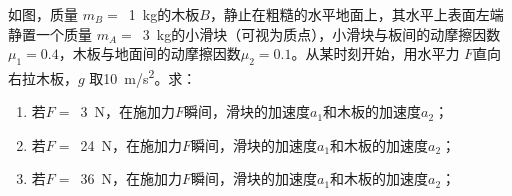 如图，质量 \(m_B=\) \,\qty{1}{kg}的木板\(B\)，静止在粗糙的水平地面上，其水平上表面左端静置一个质量 \(m_A =\) \,\qty{3}{kg}的小滑块（可视为质点），小滑块与板间的动摩擦因数 \(\mu_1 = 0.4\)，木板与地面间的动摩擦因数\(\mu_2 = 0.1\)。从某时刻开始，用水平力 \(F\)直向右拉木板，\(g\) 取\qty{10}{m/s^2}。求：
\begin{enumerate}
	\item 若\(F =\) \,\qty{3}{N}，在施加力\(F\)瞬间，滑块的加速度\(a_1\)和木板的加速度\(a_2\)；
	\item 若\(F =\) \,\qty{24}{N}，在施加力\(F\)瞬间，滑块的加速度\(a_1\)和木板的加速度\(a_2\)；
	\item 若\(F =\) \,\qty{36}{N}，在施加力\(F\)瞬间，滑块的加速度\(a_1\)和木板的加速度\(a_2\)；
\end{enumerate}

\begin{answer}
    
\end{answer}